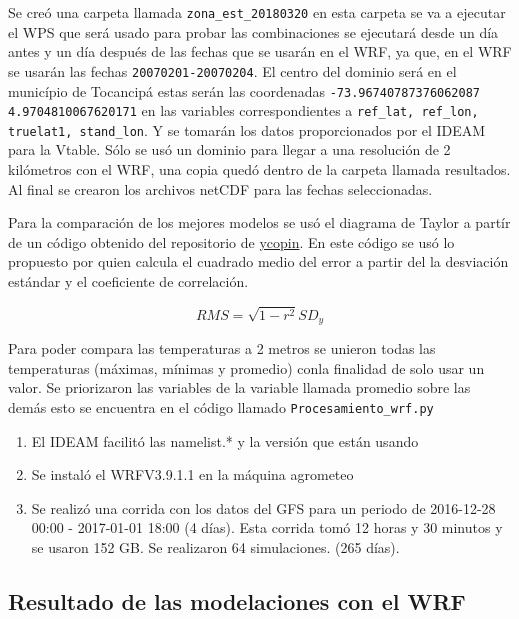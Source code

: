 \documentclass[11pt]{article}
\begin{document}
Se creó una carpeta llamada \texttt{zona\_est\_20180320} en esta carpeta se va a ejecutar el WPS que será usado para probar las combinaciones se ejecutará desde un día antes y un día después de las fechas que se usarán en el WRF, ya que, en el WRF se usarán las fechas \texttt{20070201-20070204}. El centro del dominio será en el município de Tocancipá estas serán las coordenadas \texttt{-73.96740787376062087 4.9704810067620171} en las variables correspondientes a \texttt{ref\_lat, ref\_lon, truelat1, stand\_lon}. Y se tomarán los datos proporcionados por el IDEAM para la Vtable. Sólo se usó un dominio para llegar a una resolución de 2 kilómetros con el WRF, una copia quedó dentro de la carpeta llamada resultados.\\

Al final se crearon los archivos netCDF para las fechas seleccionadas. 

Para la comparación de los mejores modelos se usó el diagrama de Taylor a partír de un código obtenido del repositorio de \textcolor{blue}{ \href{https://gist.github.com/ycopin/3342888}{ycopin}}. En este código se usó lo propuesto por \citet{barnston1992} quien calcula el cuadrado medio del error a partir del la desviación estándar y el coeficiente de correlación.

\begin{equation}\label{eq:rms}
	     RMS = \sqrt{1-r^{2}}SD_{y}
\end{equation}

Para poder compara las temperaturas a 2 metros se unieron todas las temperaturas (máximas, mínimas y promedio) conla finalidad de solo usar un valor. Se priorizaron las variables de la variable llamada promedio sobre las demás esto se encuentra en el código llamado \texttt{Procesamiento\_wrf.py}

\begin{enumerate}

\item El IDEAM facilitó las namelist.* y la versión que están usando
\item Se instaló el WRFV3.9.1.1 en la máquina agrometeo
\item Se realizó una corrida con los datos del GFS para un periodo de 2016-12-28 00:00 - 2017-01-01 18:00 (4 días). Esta corrida tomó 12 horas y 30 minutos y se usaron 152 GB. Se realizaron 64 simulaciones. (265 días).

\end{enumerate}

\subsection{Resultado de las modelaciones con el WRF}
\end{document}
